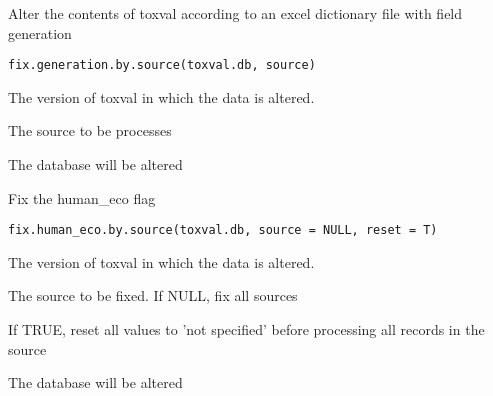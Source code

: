 \documentclass[letterpaper]{book}
\begin{document}
%
\begin{Description}\relax
Alter the contents of toxval according to an excel dictionary file with field generation
\end{Description}
%
\begin{Usage}
\begin{verbatim}
fix.generation.by.source(toxval.db, source)
\end{verbatim}
\end{Usage}
%
\begin{Arguments}
\begin{ldescription}
\item[\code{toxval.db}] The version of toxval in which the data is altered.

\item[\code{source}] The source to be processes
\end{ldescription}
\end{Arguments}
%
\begin{Value}
The database will be altered
\end{Value}
%
\begin{Description}\relax
Fix the human\_eco flag
\end{Description}
%
\begin{Usage}
\begin{verbatim}
fix.human_eco.by.source(toxval.db, source = NULL, reset = T)
\end{verbatim}
\end{Usage}
%
\begin{Arguments}
\begin{ldescription}
\item[\code{toxval.db}] The version of toxval in which the data is altered.

\item[\code{source}] The source to be fixed. If NULL, fix all sources

\item[\code{reset}] If TRUE, reset all values to 'not specified' before processing all records in the source
\end{ldescription}
\end{Arguments}
%
\begin{Value}
The database will be altered
\end{Value}
\end{document}
